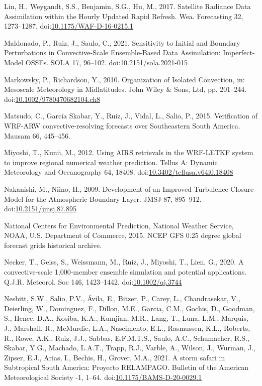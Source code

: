 \documentclass[final,5p,times,twocolumn,authoryear]{elsarticle} %
\begin{document}
\leavevmode\hypertarget{ref-lin2017a}{}%
Lin, H., Weygandt, S.S., Benjamin, S.G., Hu, M., 2017. Satellite Radiance Data Assimilation within the Hourly Updated Rapid Refresh. Wea. Forecasting 32, 1273--1287. doi:\href{https://doi.org/10.1175/WAF-D-16-0215.1}{10.1175/WAF-D-16-0215.1}

\leavevmode\hypertarget{ref-maldonado2021}{}%
Maldonado, P., Ruiz, J., Saulo, C., 2021. Sensitivity to Initial and Boundary Perturbations in Convective-Scale Ensemble-Based Data Assimilation: Imperfect-Model OSSEs. SOLA 17, 96--102. doi:\href{https://doi.org/10.2151/sola.2021-015}{10.2151/sola.2021-015}

\leavevmode\hypertarget{ref-markowsky2010}{}%
Markowsky, P., Richardson, Y., 2010. Organization of Isolated Convection, in: Mesoscale Meteorology in Midlatitudes. John Wiley \& Sons, Ltd, pp. 201--244. doi:\href{https://doi.org/10.1002/9780470682104.ch8}{10.1002/9780470682104.ch8}

\leavevmode\hypertarget{ref-matsudo2015}{}%
Matsudo, C., García Skabar, Y., Ruiz, J., Vidal, L., Salio, P., 2015. Verification of WRF-ARW convective-resolving forecasts over Southeastern South America. Mausam 66, 445--456.

\leavevmode\hypertarget{ref-miyoshi2012a}{}%
Miyoshi, T., Kunii, M., 2012. Using AIRS retrievals in the WRF-LETKF system to improve regional numerical weather prediction. Tellus A: Dynamic Meteorology and Oceanography 64, 18408. doi:\href{https://doi.org/10.3402/tellusa.v64i0.18408}{10.3402/tellusa.v64i0.18408}

\leavevmode\hypertarget{ref-nakanishi2009}{}%
Nakanishi, M., Niino, H., 2009. Development of an Improved Turbulence Closure Model for the Atmospheric Boundary Layer. JMSJ 87, 895--912. doi:\href{https://doi.org/10.2151/jmsj.87.895}{10.2151/jmsj.87.895}

\leavevmode\hypertarget{ref-cisl_rda_ds084.1}{}%
National Centers for Environmental Prediction, National Weather Service, NOAA, U.S. Department of Commerce, 2015. NCEP GFS 0.25 degree global forecast grids historical archive.

\leavevmode\hypertarget{ref-necker2020}{}%
Necker, T., Geiss, S., Weissmann, M., Ruiz, J., Miyoshi, T., Lien, G., 2020. A convective‐scale 1,000‐member ensemble simulation and potential applications. Q.J.R. Meteorol. Soc 146, 1423--1442. doi:\href{https://doi.org/10.1002/qj.3744}{10.1002/qj.3744}

\leavevmode\hypertarget{ref-nesbitt2021}{}%
Nesbitt, S.W., Salio, P.V., Ávila, E., Bitzer, P., Carey, L., Chandrasekar, V., Deierling, W., Dominguez, F., Dillon, M.E., Garcia, C.M., Gochis, D., Goodman, S., Hence, D.A., Kosiba, K.A., Kumjian, M.R., Lang, T., Luna, L.M., Marquis, J., Marshall, R., McMurdie, L.A., Nascimento, E.L., Rasmussen, K.L., Roberts, R., Rowe, A.K., Ruiz, J.J., Sabbas, E.F.M.T.S., Saulo, A.C., Schumacher, R.S., Skabar, Y.G., Machado, L.A.T., Trapp, R.J., Varble, A., Wilson, J., Wurman, J., Zipser, E.J., Arias, I., Bechis, H., Grover, M.A., 2021. A storm safari in Subtropical South America: Proyecto RELAMPAGO. Bulletin of the American Meteorological Society -1, 1--64. doi:\href{https://doi.org/10.1175/BAMS-D-20-0029.1}{10.1175/BAMS-D-20-0029.1}
\end{document}
